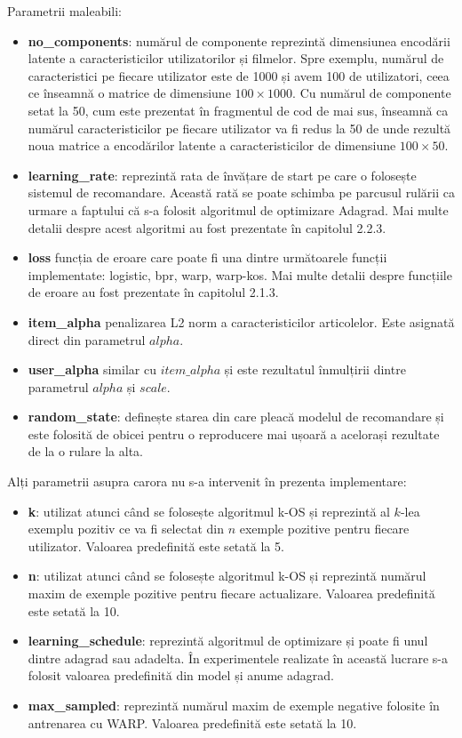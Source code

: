 Parametrii maleabili:
\begin{itemize}
  \item \textbf{no\_components}: numărul de componente reprezintă dimensiunea encodării latente a caracteristicilor utilizatorilor și filmelor. Spre exemplu, numărul de caracteristici pe fiecare utilizator este de 1000 și avem 100 de utilizatori, ceea ce înseamnă o matrice de dimensiune $100 \times 1000$. Cu numărul de componente setat la 50, cum este prezentat în fragmentul de cod de mai sus, înseamnă ca numărul caracteristicilor pe fiecare utilizator va fi redus la 50 de unde rezultă noua matrice a encodărilor latente a caracteristicilor de dimensiune $100 \times 50$.
  \item \textbf{learning\_rate}: reprezintă rata de învățare de start pe care o folosește sistemul de recomandare. Această rată se poate schimba pe parcusul rulării ca urmare a faptului că s-a folosit algoritmul de optimizare Adagrad. Mai multe detalii despre acest algoritmi au fost prezentate în capitolul 2.2.3.
  \item \textbf{loss} funcția de eroare care poate fi una dintre următoarele funcții implementate: logistic, bpr, warp, warp-kos. Mai multe detalii despre funcțiile de eroare au fost prezentate în capitolul 2.1.3.
  \item \textbf{item\_alpha} penalizarea L2 norm a caracteristicilor articolelor. Este asignată direct din parametrul $alpha$.
  \item \textbf{user\_alpha} similar cu $item\_alpha$ și este rezultatul înmulțirii dintre parametrul $alpha$ și $scale$.
  \item \textbf{random\_state}: definește starea din care pleacă modelul de recomandare și este folosită de obicei pentru o reproducere mai ușoară a acelorași rezultate de la o rulare la alta.
\end{itemize}

Alți parametrii asupra carora nu s-a intervenit în prezenta implementare:
\begin{itemize}
	\item \textbf{k}: utilizat atunci când se folosește algoritmul k-OS și reprezintă al $k$-lea exemplu pozitiv ce va fi selectat din $n$ exemple pozitive pentru fiecare utilizator. Valoarea predefinită este setată la 5.
	\item \textbf{n}: utilizat atunci când se folosește algoritmul k-OS și reprezintă numărul maxim de exemple pozitive pentru fiecare actualizare. Valoarea predefinită este setată la 10.
	\item \textbf{learning\_schedule}: reprezintă algoritmul de optimizare și poate fi unul dintre adagrad sau adadelta. În experimentele realizate în această lucrare s-a folosit valoarea predefinită din model și anume adagrad.
	\item \textbf{max\_sampled}: reprezintă numărul maxim de exemple negative folosite în antrenarea cu WARP. Valoarea predefinită este setată la 10.
\end{itemize}

